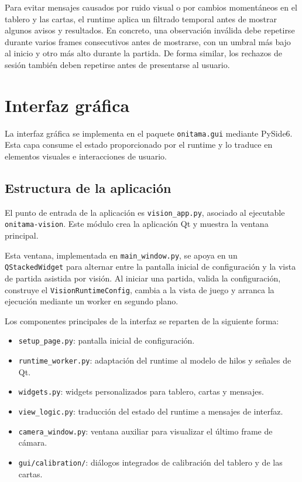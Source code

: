 Para evitar mensajes causados por ruido visual o por cambios momentáneos en el tablero y las cartas, el runtime aplica un filtrado temporal antes de mostrar algunos avisos y resultados. En concreto, una observación inválida debe repetirse durante varios frames consecutivos antes de mostrarse, con un umbral más bajo al inicio y otro más alto durante la partida. De forma similar, los rechazos de sesión también deben repetirse antes de presentarse al usuario.


\section{Interfaz gráfica}
\label{sec:interfaz-grafica}

La interfaz gráfica se implementa en el paquete \texttt{onitama.gui} mediante PySide6. Esta capa consume el estado proporcionado por el runtime y lo traduce en elementos visuales e interacciones de usuario.

\subsection{Estructura de la aplicación}
\label{subsec:estructura-gui}

El punto de entrada de la aplicación es \texttt{vision\_app.py}, asociado al ejecutable \texttt{onitama-vision}. Este módulo crea la aplicación Qt y muestra la ventana principal.

Esta ventana, implementada en \texttt{main\_window.py}, se apoya en un \\ \texttt{QStackedWidget} para alternar entre la pantalla inicial de configuración y la vista de partida asistida por visión. Al iniciar una partida, valida la configuración, construye el \texttt{VisionRuntimeConfig}, cambia a la vista de juego y arranca la ejecución mediante un worker en segundo plano.

Los componentes principales de la interfaz se reparten de la siguiente forma:

\begin{itemize}
    \item \texttt{setup\_page.py}: pantalla inicial de configuración.
    \item \texttt{runtime\_worker.py}: adaptación del runtime al modelo de hilos y señales de Qt.
    \item \texttt{widgets.py}: widgets personalizados para tablero, cartas y mensajes.
    \item \texttt{view\_logic.py}: traducción del estado del runtime a mensajes de interfaz.
    \item \texttt{camera\_window.py}: ventana auxiliar para visualizar el último frame de cámara.
    \item \texttt{gui/calibration/}: diálogos integrados de calibración del tablero y de las cartas.
\end{itemize}

